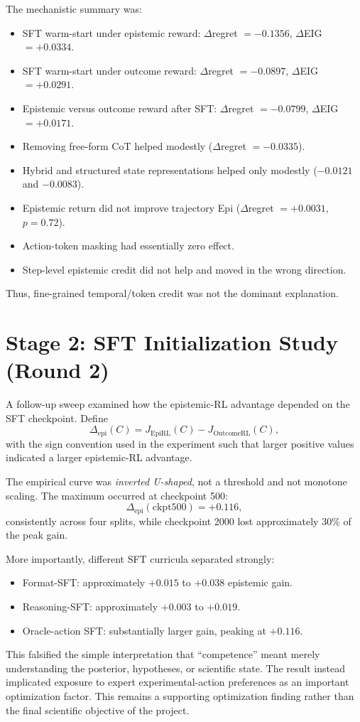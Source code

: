 \documentclass[11pt]{article}
\begin{document}
The mechanistic summary was:
\begin{itemize}
    \item SFT warm-start under epistemic reward: $\Delta$regret $=-0.1356$, $\Delta$EIG $=+0.0334$.
    \item SFT warm-start under outcome reward: $\Delta$regret $=-0.0897$, $\Delta$EIG $=+0.0291$.
    \item Epistemic versus outcome reward after SFT: $\Delta$regret $=-0.0799$, $\Delta$EIG $=+0.0171$.
    \item Removing free-form CoT helped modestly ($\Delta$regret $=-0.0335$).
    \item Hybrid and structured state representations helped only modestly ($-0.0121$ and $-0.0083$).
    \item Epistemic return did not improve trajectory Epi ($\Delta$regret $=+0.0031$, $p=0.72$).
    \item Action-token masking had essentially zero effect.
    \item Step-level epistemic credit did not help and moved in the wrong direction.
\end{itemize}
Thus, fine-grained temporal/token credit was not the dominant explanation.

\section{Stage 2: SFT Initialization Study (Round 2)}
A follow-up sweep examined how the epistemic-RL advantage depended on the SFT checkpoint. Define
\[
\Delta_{\mathrm{epi}}(C)
=J_{\mathrm{EpiRL}}(C)-J_{\mathrm{OutcomeRL}}(C),
\]
with the sign convention used in the experiment such that larger positive values indicated a larger epistemic-RL advantage.

The empirical curve was \emph{inverted U-shaped}, not a threshold and not monotone scaling. The maximum occurred at checkpoint 500:
\[
\boxed{\Delta_{\mathrm{epi}}(\mathrm{ckpt500})=+0.116,}
\]
consistently across four splits, while checkpoint 2000 lost approximately 30\% of the peak gain.

More importantly, different SFT curricula separated strongly:
\begin{itemize}
    \item Format-SFT: approximately $+0.015$ to $+0.038$ epistemic gain.
    \item Reasoning-SFT: approximately $+0.003$ to $+0.019$.
    \item Oracle-action SFT: substantially larger gain, peaking at $+0.116$.
\end{itemize}
This falsified the simple interpretation that ``competence'' meant merely understanding the posterior, hypotheses, or scientific state. The result instead implicated exposure to expert experimental-action preferences as an important optimization factor. This remains a supporting optimization finding rather than the final scientific objective of the project.
\end{document}
